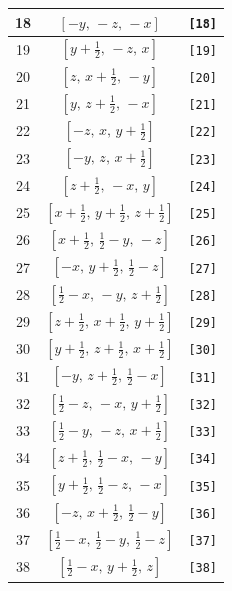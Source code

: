 \documentclass[fleqn,8pt]{jsarticle}
\begin{document}
\begin{longtable}{ccc}
18 & $\left[ - y,\, - z,\, - x \right]$ & {\tt [18]} \\ \hline
19 & $\left[ y + \frac{1}{2},\, - z,\, x \right]$ & {\tt [19]} \\ \hline
20 & $\left[ z,\, x + \frac{1}{2},\, - y \right]$ & {\tt [20]} \\ \hline
21 & $\left[ y,\, z + \frac{1}{2},\, - x \right]$ & {\tt [21]} \\ \hline
22 & $\left[ - z,\, x,\, y + \frac{1}{2} \right]$ & {\tt [22]} \\ \hline
23 & $\left[ - y,\, z,\, x + \frac{1}{2} \right]$ & {\tt [23]} \\ \hline
24 & $\left[ z + \frac{1}{2},\, - x,\, y \right]$ & {\tt [24]} \\ \hline
25 & $\left[ x + \frac{1}{2},\, y + \frac{1}{2},\, z + \frac{1}{2} \right]$ & {\tt [25]} \\ \hline
26 & $\left[ x + \frac{1}{2},\, \frac{1}{2} - y,\, - z \right]$ & {\tt [26]} \\ \hline
27 & $\left[ - x,\, y + \frac{1}{2},\, \frac{1}{2} - z \right]$ & {\tt [27]} \\ \hline
28 & $\left[ \frac{1}{2} - x,\, - y,\, z + \frac{1}{2} \right]$ & {\tt [28]} \\ \hline
29 & $\left[ z + \frac{1}{2},\, x + \frac{1}{2},\, y + \frac{1}{2} \right]$ & {\tt [29]} \\ \hline
30 & $\left[ y + \frac{1}{2},\, z + \frac{1}{2},\, x + \frac{1}{2} \right]$ & {\tt [30]} \\ \hline
31 & $\left[ - y,\, z + \frac{1}{2},\, \frac{1}{2} - x \right]$ & {\tt [31]} \\ \hline
32 & $\left[ \frac{1}{2} - z,\, - x,\, y + \frac{1}{2} \right]$ & {\tt [32]} \\ \hline
33 & $\left[ \frac{1}{2} - y,\, - z,\, x + \frac{1}{2} \right]$ & {\tt [33]} \\ \hline
34 & $\left[ z + \frac{1}{2},\, \frac{1}{2} - x,\, - y \right]$ & {\tt [34]} \\ \hline
35 & $\left[ y + \frac{1}{2},\, \frac{1}{2} - z,\, - x \right]$ & {\tt [35]} \\ \hline
36 & $\left[ - z,\, x + \frac{1}{2},\, \frac{1}{2} - y \right]$ & {\tt [36]} \\ \hline
37 & $\left[ \frac{1}{2} - x,\, \frac{1}{2} - y,\, \frac{1}{2} - z \right]$ & {\tt [37]} \\ \hline
38 & $\left[ \frac{1}{2} - x,\, y + \frac{1}{2},\, z \right]$ & {\tt [38]} \\ \hline

\end{longtable}
\end{document}
